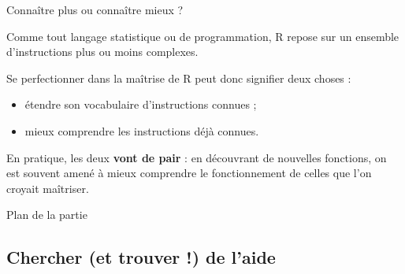 \documentclass[12pt,ignorenonframetext,handout,]{beamer}
\providecommand{\tightlist}{%
  \setlength{\itemsep}{0pt}\setlength{\parskip}{0pt}}
\begin{document}
\begin{frame}{Connaître plus ou connaître mieux ?}
\protect\hypertarget{connaitre-plus-ou-connaitre-mieux}{}

Comme tout langage statistique ou de programmation, R repose sur un
ensemble d’instructions plus ou moins complexes.

\pause \bigskip

Se perfectionner dans la maîtrise de R peut donc signifier deux choses :

\begin{itemize}
\tightlist
\item
  étendre son \og vocabulaire \fg{} d’instructions connues ;
\item
  mieux comprendre les instructions déjà connues.
\end{itemize}

\pause \bigskip

En pratique, les deux \textbf{vont de pair} : en découvrant de nouvelles
fonctions, on est souvent amené à mieux comprendre le fonctionnement de
celles que l’on croyait maîtriser.

\end{frame}

\begin{frame}{Plan de la partie}
\protect\hypertarget{plan-de-la-partie}{}

\Large 
\tableofcontents[currentsection, sectionstyle = hide, subsectionstyle = show/show/hide]

\end{frame}

\hypertarget{chercher-et-trouver-de-laide}{%
\subsection{Chercher (et trouver !) de
l’aide}\label{chercher-et-trouver-de-laide}}
\end{document}
